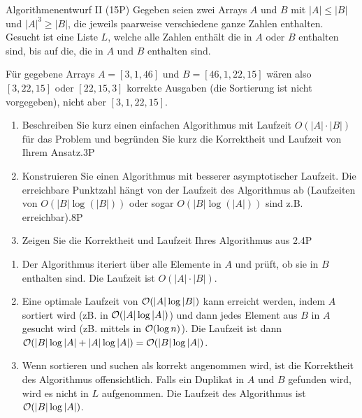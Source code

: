 \documentclass{article}
\begin{document}
\begin{exercise}{Algorithmenentwurf II (15P)}
  Gegeben seien zwei Arrays $A$ und $B$ mit $|A| \leq |B|$ und $|A|^3 \geq |B|$, die jeweils paarweise verschiedene ganze Zahlen enthalten. Gesucht ist eine Liste $L$, welche alle Zahlen enthält die in $A$ oder $B$ enthalten sind, bis auf die, die in $A$ und $B$ enthalten sind.\par
  Für gegebene Arrays $A = [3,1,46]$ und $B = [46,1,22,15]$ wären also $[3,22,15]$ oder $[22, 15, 3]$ korrekte Ausgaben (die Sortierung ist nicht vorgegeben), nicht aber $[3, 1, 22, 15]$.
  \begin{enumerate}
    \item Beschreiben Sie kurz einen einfachen Algorithmus mit Laufzeit $O(|A| \cdot |B|)$ für das Problem und begründen Sie kurz die Korrektheit und Laufzeit von Ihrem Ansatz.\hfill 3P
    \item Konstruieren Sie einen Algorithmus mit besserer asymptotischer Laufzeit. Die erreichbare Punktzahl hängt von der Laufzeit des Algorithmus ab (Laufzeiten von $O(|B| \log(|B|))$ oder sogar $O(|B| \log(|A|))$ sind z.B. erreichbar).\hfill 8P
    \item Zeigen Sie die Korrektheit und Laufzeit Ihres Algorithmus aus 2.\hfill 4P
  \end{enumerate}
  \begin{solution}
    \begin{enumerate}
      \item Der Algorithmus iteriert über alle Elemente in $A$ und prüft, ob sie in $B$ enthalten sind. Die Laufzeit ist $O(|A| \cdot |B|)$.
      \item Eine optimale Laufzeit von $\mathcal{O}(|A| \log |B|)$ kann erreicht werden, indem $A$ sortiert wird (zB.  in $\mathcal{O}(|A|\log|A|)$) und dann jedes Element aus $B$ in $A$ gesucht wird (zB. mittels  in $\mathcal{O}(\log n)$). Die Laufzeit ist dann $\mathcal{O}(|B| \log |A| + |A| \log |A|)=\mathcal{O}(|B| \log |A|)$.
      \item Wenn sortieren und suchen als korrekt angenommen wird, ist die Korrektheit des Algorithmus offensichtlich. Falls ein Duplikat in $A$ und $B$ gefunden wird, wird es nicht in $L$ aufgenommen. Die Laufzeit des Algorithmus ist $\mathcal{O}(|B| \log |A|)$.
    \end{enumerate}
  \end{solution}
\end{exercise}
\end{document}

